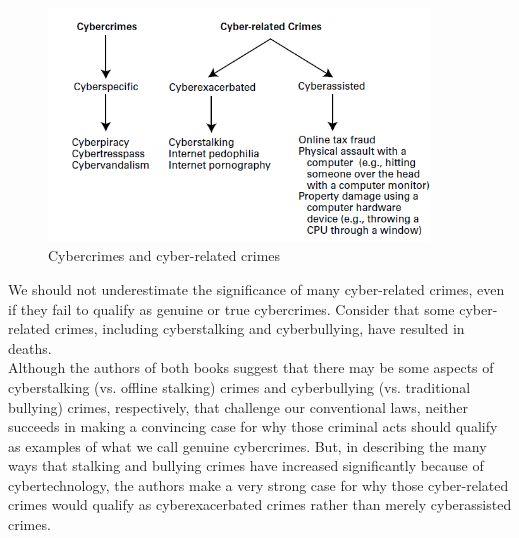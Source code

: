\documentclass[12pt]{article}
\theoremstyle{definition}
\begin{document}
\begin{figure}[h]
\includegraphics[width=0.9\textwidth]{7.png}
\caption{Cybercrimes and cyber-related crimes}
\end{figure}
We should not underestimate the significance of many cyber-related crimes, even if
they fail to qualify as genuine or true cybercrimes. Consider that some cyber-related crimes, including cyberstalking and cyberbullying, have resulted in deaths.\\
Although the authors of both books suggest that there may be
some aspects of cyberstalking (vs. offline stalking) crimes and cyberbullying (vs. traditional
bullying) crimes, respectively, that challenge our conventional laws, neither
succeeds in making a convincing case for why those criminal acts should qualify as
examples of what we call genuine cybercrimes. But, in describing the many ways that
stalking and bullying crimes have increased significantly because of cybertechnology, the
authors make a very strong case for why those cyber-related crimes would qualify as
cyberexacerbated crimes rather than merely cyberassisted crimes.
\end{document}
